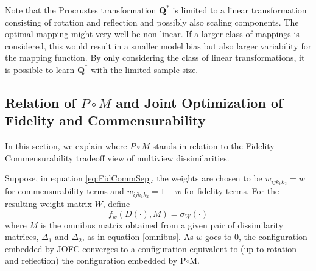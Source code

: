 \documentclass[12pt,oneside,final]{thesis}
\begin{document}
Note that the Procrustes transformation $\mathbf{Q}^*$  is limited to  a linear transformation consisting of rotation and reflection and possibly also scaling components. The optimal mapping might  very well be   non-linear. If a larger class of mappings is considered, this would result in a smaller model bias but also larger variability for the mapping function. By only considering the class of linear transformations, it is possible to learn $\mathbf{Q}^{*}$ with the limited sample size.

\subsection{Relation of $P\circ M$ and Joint Optimization of Fidelity and Commensurability} 

In this section, we explain where $P\circ M$ stands in relation to the Fidelity-Commensurability tradeoff view of multiview dissimilarities.

Suppose, in equation \eqref{eq:FidCommSep}, the weights are chosen to be $w_{ijk_1k_2}=w$ for commensurability terms and $w_{ijk_1k_2}=1-w$ for fidelity terms. For the resulting weight matrix $W$, define 
\begin{equation}
f_w(D(\cdot),M) = \sigma_W(\cdot) \label{fid-comm-tradeoff-func}
\end{equation}
 where $M$ is the omnibus matrix obtained from  a given pair of dissimilarity matrices, $\Delta_1$ and $\Delta_2$, as in equation \eqref{omnibus}.   As $w$ goes to 0, the configuration embedded by JOFC converges to a configuration equivalent to (up to rotation and reflection)  the configuration embedded by P$\circ$M.
\end{document}
